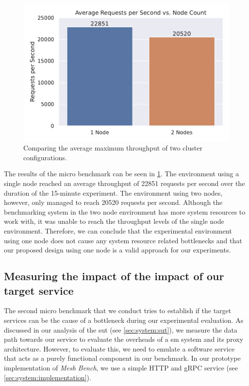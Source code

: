 \begin{figure}[!t]
    \centering
    
    \includegraphics[width=0.8\linewidth]{5_experimental_evaluation/figures/microbench-node-count.pdf}

    \caption[Micro Benchmark - Comparing the average maximum throughput of two cluster configurations]{Comparing the average maximum throughput of two cluster configurations.}
    
    \label{fig:microbench:node-count}
\end{figure}

The results of the micro benchmark can be seen in \cref{fig:microbench:node-count}. The environment using a single node reached an average throughput of 22851 requests per second over the duration of the 15-minute experiment. The environment using two nodes, however, only managed to reach 20520 requests per second. Although the benchmarking system in the two node environment has more system resources to work with, it was unable to reach the throughput levels of the single node environment. Therefore, we can conclude that the experimental environment using one node does not cause any system resource related bottlenecks and that our proposed design using one node is a valid approach for our experiments.


\subsection{Measuring the impact of the impact of our target service}
\label{sec:experiments:microbenchmarks:target-svc}

The second micro benchmark that we conduct tries to establish if the target services can be the cause of a bottleneck during our experimental evaluation. As discussed in our analysis of the \gls{sut} (see \cref{sec:system:sut}), we measure the data path towards our service to evaluate the overheads of a \gls{sm} system and its proxy architecture. However, to evaluate this, we need to emulate a software service that acts as a purely functional component in our benchmark. In our prototype implementation of \textit{Mesh Bench}, we use a simple HTTP and gRPC service (see \cref{sec:system:implementation}). 

